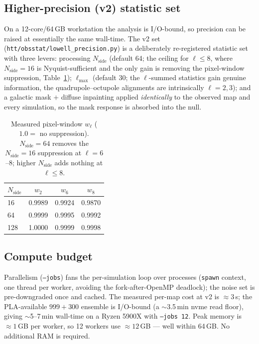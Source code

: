 \documentclass[11pt]{article}
\newcommand{\code}[1]{\texttt{\small #1}}
\begin{document}
\subsection{Higher-precision (v2) statistic set}
On a 12-core/64\,GB workstation the analysis is I/O-bound, so precision can be
raised at essentially the same wall-time. The v2 set
(\code{htt/obsstat/lowell\_precision.py}) is a deliberately re-registered
statistic set with three levers: processing $N_{\mathrm{side}}$ (default 64; the
ceiling for $\ell\le 8$, where $N_{\mathrm{side}}=16$ is Nyquist-sufficient and
the only gain is removing the pixel-window suppression, Table~\ref{tab:pixwin});
$\ell_{\max}$ (default 30; the $\ell$-summed statistics gain genuine information,
the quadrupole--octupole alignments are intrinsically $\ell=2,3$); and a galactic
mask $+$ diffuse inpainting applied \emph{identically} to the observed map and
every simulation, so the mask response is absorbed into the null.

\begin{table}[htbp]\centering\small
\caption{Measured pixel-window $w_\ell$ ($1.0=$ no suppression). $N_{\mathrm{side}}=64$
removes the $N_{\mathrm{side}}=16$ suppression at $\ell=6$--$8$; higher
$N_{\mathrm{side}}$ adds nothing at $\ell\le 8$.}
\label{tab:pixwin}
\begin{tabular}{@{}lccc@{}}
\toprule
$N_{\mathrm{side}}$ & $w_2$ & $w_6$ & $w_8$ \\
\midrule
16  & 0.9989 & 0.9924 & 0.9870 \\
64  & 0.9999 & 0.9995 & 0.9992 \\
128 & 1.0000 & 0.9999 & 0.9998 \\
\bottomrule
\end{tabular}
\end{table}

\subsection{Compute budget}
Parallelism (\code{--jobs}) fans the per-simulation loop over processes
(\code{spawn} context, one thread per worker, avoiding the fork-after-OpenMP
deadlock); the noise set is pre-downgraded once and cached. The measured per-map
cost at v2 is $\approx 3$\,s; the PLA-available $999{+}300$ ensemble is I/O-bound
(a $\sim$3.5\,min nvme read floor), giving $\sim$5--7\,min wall-time on a Ryzen
5900X with \code{--jobs 12}. Peak memory is $\approx 1$\,GB per worker, so 12
workers use $\approx 12$\,GB --- well within 64\,GB. No additional RAM is
required.
\end{document}
